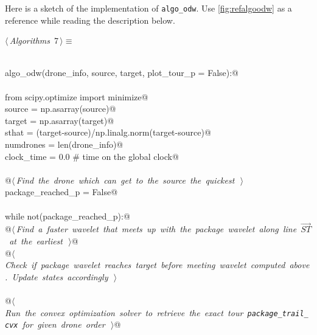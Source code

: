 \documentclass[10pt, english, oneside]{report}
\begin{document}
Here is a sketch of the implementation of \verb|algo_odw|. Use \autoref{fig:refalgoodw} as a reference while reading the
description below. 

\begin{flushleft} \small
\begin{minipage}{\linewidth}\label{scrap3}\raggedright\small
{} $\langle\,${\itshape Algorithms}\nobreak\ {\footnotesize {7}}$\,\rangle\equiv$
\vspace{-1ex}
\begin{list}{}{} \item
\mbox{}\verb@@\\
\mbox{}\verb@def algo_odw(drone_info, source, target, plot_tour_p = False):@\\
\mbox{}\verb@@\\
\mbox{}\verb@    from scipy.optimize import minimize@\\
\mbox{}\verb@    source     = np.asarray(source)@\\
\mbox{}\verb@    target     = np.asarray(target)@\\
\mbox{}\verb@    sthat      = (target-source)/np.linalg.norm(target-source)@\\
\mbox{}\verb@    numdrones  = len(drone_info)@\\
\mbox{}\verb@    clock_time = 0.0  # time on the global clock@\\
\mbox{}\verb@@\\
\mbox{}\verb@    @\hbox{$\langle\,${\itshape Find the drone which can get to the source the quickest}\nobreak\ {\footnotesize {}}$\,\rangle$}\verb@@\\
\mbox{}\verb@    package_reached_p      = False@\\
\mbox{}\verb@@\\
\mbox{}\verb@    while not(package_reached_p):@\\
\mbox{}\verb@         @\hbox{$\langle\,${\itshape Find a faster wavelet that meets up with the package wavelet along line $\vec{ST}$ at the earliest}\nobreak\ {\footnotesize {}}$\,\rangle$}\verb@        @\\
\mbox{}\verb@         @\hbox{$\langle\,${\itshape Check if package wavelet reaches target before meeting wavelet computed above. Update states accordingly}\nobreak\ {\footnotesize {}}$\,\rangle$}\verb@@\\
\mbox{}\verb@@\\
\mbox{}\verb@    @\hbox{$\langle\,${\itshape Run the convex optimization solver to retrieve the exact tour \verb|package_trail_cvx| for given drone order}\nobreak\ {\footnotesize {}}$\,\rangle$}\verb@      @\\

\end{list}
\end{minipage}
\end{flushleft}
\end{document}
